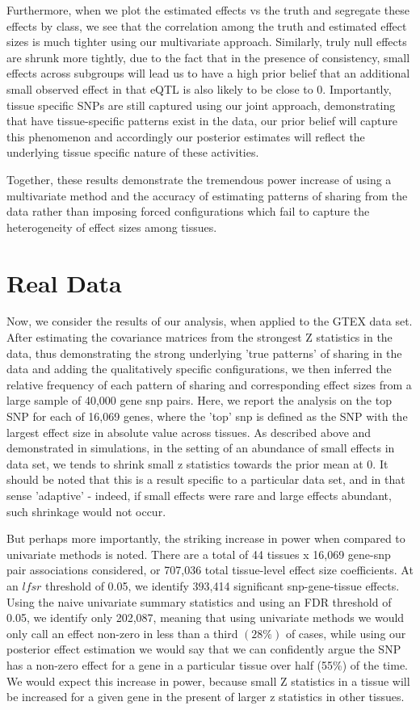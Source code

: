 Furthermore, when we plot the estimated effects vs the truth and segregate these effects by class, we see that the correlation among the truth and estimated effect sizes is much tighter using our multivariate approach. Similarly, truly null effects are shrunk more tightly, due to the fact that in the presence of consistency, small effects across subgroups will lead us to have a high prior belief that an additional small observed effect in that eQTL is also likely to be close to 0. Importantly, tissue specific SNPs are still captured using our joint approach, demonstrating that have tissue-specific patterns exist in the data, our prior belief will capture this phenomenon and accordingly our posterior estimates will reflect the underlying tissue specific nature of these activities.

Together, these results demonstrate the tremendous power increase of using a multivariate method and the accuracy of estimating patterns of sharing from the data rather than imposing forced configurations which fail to capture the heterogeneity of effect sizes among tissues.


\section{Real Data}

Now, we consider the results of our analysis, when applied to the GTEX data set. After estimating the covariance matrices from the strongest Z statistics in the data, thus demonstrating the strong underlying 'true patterns' of sharing in the data and adding the qualitatively specific configurations, we then inferred the relative frequency of each pattern of sharing and corresponding effect sizes from a large sample of 40,000 gene snp pairs. Here, we report the analysis on the top SNP for each of 16,069 genes, where the 'top' snp is defined as the SNP with the largest effect size in absolute value across tissues. As described above and demonstrated in simulations, in the setting of an abundance of small effects in data set, we  tends to shrink small z statistics towards the prior mean at 0. It should be noted that this is a result specific to a particular data set, and in that sense 'adaptive' - indeed, if small effects were rare and large effects abundant, such shrinkage would not occur. 

But perhaps more importantly, the striking increase in power when compared to univariate methods is noted. There are a total of 44 tissues x 16,069 gene-snp pair associations considered, or 707,036 total tissue-level effect size coefficients. At an $lfsr$ threshold of 0.05, we identify 393,414 significant snp-gene-tissue effects. Using the naive univariate summary statistics and using an FDR threshold of 0.05, we identify only 202,087, meaning that using univariate methods we would only call an effect non-zero in less than a third $(28\%)$ of cases, while using our posterior effect estimation we would say that we can confidently argue the SNP has a non-zero effect for a gene in a particular tissue over half (55\%) of the time. We would expect this increase in power, because small Z statistics in a tissue will be increased for a given gene in the present of larger z statistics in other tissues.

